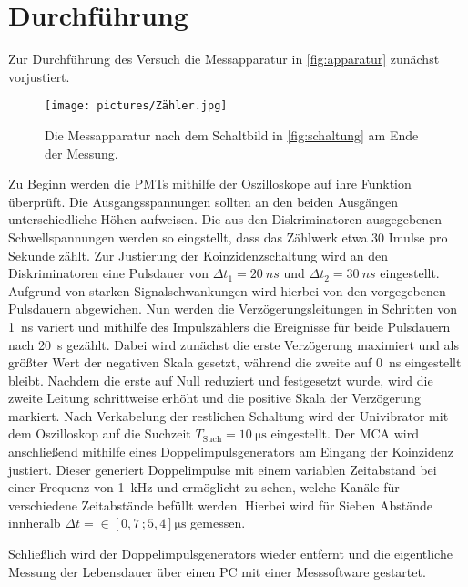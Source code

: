 \section{Durchführung}
\label{sec:Durchführung}

Zur Durchführung des Versuch die Messapparatur in \autoref{fig:apparatur} zunächst vorjustiert.
\begin{figure}
    \centering
    \texttt{[image: pictures/Zähler.jpg]}
    \caption{Die Messapparatur nach dem Schaltbild in \autoref{fig:schaltung} am Ende der Messung.}
    \label{fig:apparatur}
\end{figure}

Zu Beginn werden die PMTs mithilfe der Oszilloskope auf ihre Funktion überprüft.
Die Ausgangsspannungen sollten an den beiden Ausgängen unterschiedliche Höhen aufweisen.
Die aus den Diskriminatoren ausgegebenen Schwellspannungen werden so eingstellt,
dass das Zählwerk etwa 30 Imulse pro Sekunde zählt.
Zur Justierung der Koinzidenzschaltung wird an den Diskriminatoren eine Pulsdauer von
$\Delta t_1 = \qty{20}{ns}$ und $\Delta t_2 = \qty{30}{ns}$ eingestellt.
Aufgrund von starken Signalschwankungen wird hierbei von den vorgegebenen Pulsdauern \cite{v01} abgewichen.
Nun werden die Verzögerungsleitungen in Schritten von \qty{1}{ns} variert 
und mithilfe des Impulszählers die Ereignisse für beide Pulsdauern nach \qty{20}{s} gezählt.
Dabei wird zunächst die erste Verzögerung maximiert und als größter Wert der negativen Skala gesetzt,
während die zweite auf \qty{0}{ns} eingestellt bleibt.
Nachdem die erste auf Null reduziert und festgesetzt wurde, wird die zweite Leitung schrittweise erhöht 
und die positive Skala der Verzögerung markiert.
Nach Verkabelung der restlichen Schaltung wird der Univibrator mit dem Oszilloskop auf die Suchzeit $T_\text{Such} = \qty{10}{\micro\second}$ eingestellt.
Der MCA wird anschließend mithilfe eines Doppelimpulsgenerators am Eingang der Koinzidenz justiert.
Dieser generiert Doppelimpulse mit einem variablen Zeitabstand bei einer Frequenz von \qty{1}{kHz}
und ermöglicht zu sehen, welche Kanäle für verschiedene Zeitabstände befüllt werden.
Hierbei wird für Sieben Abstände innheralb $\Delta t = \in [0,7 \, ; 5,4] \unit{\micro\second}$ gemessen.


Schließlich wird der Doppelimpulsgenerators wieder entfernt 
und die eigentliche Messung der Lebensdauer über einen PC mit einer Messsoftware gestartet.





